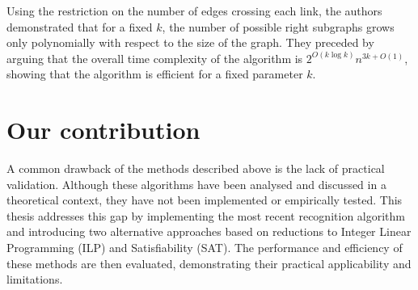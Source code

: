 Using the restriction on the number of edges crossing each link, the authors demonstrated that for a fixed \(k\), the number of possible right subgraphs grows only polynomially with respect to the size of the graph. They preceded by arguing that the overall time complexity of the algorithm is \(2^{O(k \log k)}n^{3k + O(1)}\), showing that the algorithm is efficient for a fixed parameter \(k\).

\section{Our contribution}\label{sec:our-contribution}

A common drawback of the methods described above is the lack of practical validation. Although these algorithms have been analysed and discussed in a theoretical context, they have not been implemented or empirically tested. This thesis addresses this gap by implementing the most recent recognition algorithm and introducing two alternative approaches based on reductions to Integer Linear Programming (ILP) and Satisfiability (SAT). The performance and efficiency of these methods are then evaluated, demonstrating their practical applicability and limitations.